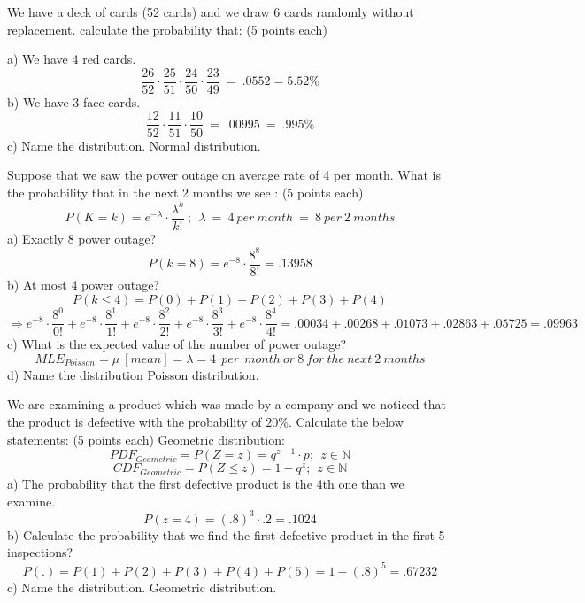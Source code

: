 \documentclass{homeworg}
\begin{document}
\exercise
We have a deck of cards (52 cards) and we draw 6 cards randomly without
replacement. calculate the probability that: (5 points each)
\newline

a) We have 4 red cards.
\newline
$$
\frac{26}{52}\cdot\frac{25}{51}\cdot\frac{24}{50}\cdot\frac{23}{49}~=
~ .0552 = 5.52\%
$$
\newline
b) We have 3 face cards.
\newline
$$
\frac{12}{52}\cdot\frac{11}{51}\cdot\frac{10}{50}~=~.00995~=~.995\%
$$
\newline
c) Name the distribution.
\newline
Normal distribution.
\newline


\exercise
Suppose that we saw the power outage on average rate of 4 per month. What is
the probability that in the next 2 months we see : (5 points each)
$$
P(K=k) = e^{-\lambda}\cdot\frac{\lambda^k}{k!}~;~~ \lambda~=~4~per~month~=~8~per~2~months
$$
a) Exactly 8 power outage?
\newline
$$
P(k=8)=e^{-8}\cdot\frac{8^8}{8!}= .13958
$$
\newline
b) At most 4 power outage?
\newline
$$
P(k\leqslant 4)=P(0)+P(1)+P(2)+P(3)+P(4)
$$
\newline
$$
\Rightarrow
e^{-8}\cdot\frac{8^0}{0!}+
e^{-8}\cdot\frac{8^1}{1!}+
e^{-8}\cdot\frac{8^2}{2!}+
e^{-8}\cdot\frac{8^3}{3!}+
e^{-8}\cdot\frac{8^4}{4!}
=.00034+.00268+.01073+.02863+.05725 = .09963
$$
\newline
c) What is the expected value of the number of power outage?
\newline
$$
MLE_{Poisson} = \mu~[mean] = \lambda = 4~~per~~month~or~8~for~the~next~2~months
$$
\newline
d) Name the distribution
\newline
Poisson distribution.
\newline

\exercise
We are examining a product which was made by a company and we noticed that the
product is defective with the probability of \(20\%\).  Calculate the below
statements: (5 points each)
\newline
Geometric distribution:
$$
PDF_{Geometric}=P(Z=z)=q^{z-1} \cdot p;~~z\in \mathbb{N}
$$
$$
CDF_{Geometric}=P(Z\leqslant z)=1-q^{z} ;~~z\in \mathbb{N}
$$
\newline
a) The probability that the first defective product is the 4th one than we
examine.
\newline
$$
P(z=4)=(.8)^{3} \cdot .2 = .1024
$$
\newline
b) Calculate the probability that we find the first defective product in the
first 5 inspections?
\newline
$$
P(.)=P(1)+P(2)+P(3)+P(4)+P(5)= 1-(.8)^5=.67232
$$
\newline
c) Name the distribution.
\newline
Geometric distribution.
\end{document}
